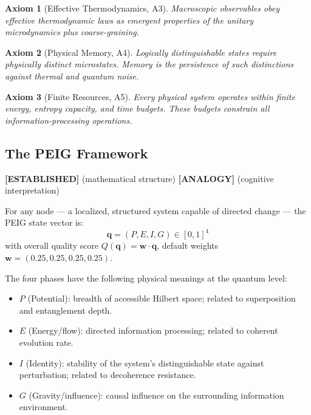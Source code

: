 \documentclass[12pt,letterpaper]{article}
\newtheorem{axiom}{Axiom}[section]
\newcommand{\ESTABLISHED}[1]{\textcolor{green!50!black}{\textbf{[ESTABLISHED]}} #1}
\newcommand{\ANALOGY}[1]{\textcolor{orange!70!black}{\textbf{[ANALOGY]}} #1}
\begin{document}
\begin{axiom}[Effective Thermodynamics, A3]
Macroscopic observables obey effective thermodynamic laws as emergent
properties of the unitary microdynamics plus coarse-graining.
\end{axiom}

\begin{axiom}[Physical Memory, A4]
Logically distinguishable states require physically distinct
microstates. Memory is the persistence of such distinctions against
thermal and quantum noise.
\end{axiom}

\begin{axiom}[Finite Resources, A5]
Every physical system operates within finite energy, entropy capacity,
and time budgets. These budgets constrain all information-processing
operations.
\end{axiom}

\subsection{The PEIG Framework}
\label{sec:prior_peig}

\ESTABLISHED{} (mathematical structure) \ANALOGY{} (cognitive interpretation)

For any node --- a localized, structured system capable of directed change
--- the PEIG state vector is:
\begin{equation}
  \mathbf{q} = (P, E, I, G) \in [0,1]^4
  \label{eq:peig_vector}
\end{equation}
with overall quality score $Q(\mathbf{q}) = \mathbf{w} \cdot \mathbf{q}$,
default weights $\mathbf{w} = (0.25, 0.25, 0.25, 0.25)$.

The four phases have the following physical meanings at the quantum level:
\begin{itemize}
  \item $P$ (Potential): breadth of accessible Hilbert space; related to
    superposition and entanglement depth.
  \item $E$ (Energy/flow): directed information processing; related to
    coherent evolution rate.
  \item $I$ (Identity): stability of the system's distinguishable state
    against perturbation; related to decoherence resistance.
  \item $G$ (Gravity/influence): causal influence on the surrounding
    information environment.
\end{itemize}
\end{document}
